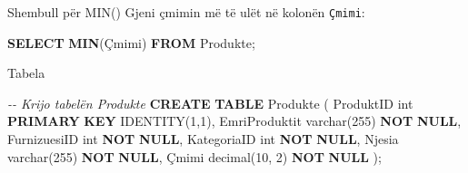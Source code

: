 \documentclass[
  ignorenonframetext,
]{beamer}
\newenvironment{Shaded}{\begin{snugshade}}{\end{snugshade}}
\newcommand{\CommentTok}[1]{\textcolor[rgb]{0.56,0.35,0.01}{\textit{#1}}}
\newcommand{\DataTypeTok}[1]{\textcolor[rgb]{0.13,0.29,0.53}{#1}}
\newcommand{\DecValTok}[1]{\textcolor[rgb]{0.00,0.00,0.81}{#1}}
\newcommand{\FunctionTok}[1]{\textcolor[rgb]{0.13,0.29,0.53}{\textbf{#1}}}
\newcommand{\KeywordTok}[1]{\textcolor[rgb]{0.13,0.29,0.53}{\textbf{#1}}}
\newcommand{\NormalTok}[1]{#1}
\begin{document}
\begin{frame}[fragile]{Shembull për MIN()}
\label{shembull-puxebr-min}
Gjeni çmimin më të ulët në kolonën \texttt{Çmimi}:


\begin{Shaded}
\begin{Highlighting}[]
\KeywordTok{SELECT} \FunctionTok{MIN}\NormalTok{(Çmimi)}
\KeywordTok{FROM}\NormalTok{ Produkte;}
\end{Highlighting}
\end{Shaded}
\end{frame}

\begin{frame}[fragile]{Tabela}
\label{tabela-2}

\begin{Shaded}
\begin{Highlighting}[]
\CommentTok{{-}{-} Krijo tabelën Produkte}
\KeywordTok{CREATE} \KeywordTok{TABLE}\NormalTok{ Produkte (}
\NormalTok{  ProduktID }\DataTypeTok{int} \KeywordTok{PRIMARY} \KeywordTok{KEY}\NormalTok{ IDENTITY(}\DecValTok{1}\NormalTok{,}\DecValTok{1}\NormalTok{),}
\NormalTok{  EmriProduktit }\DataTypeTok{varchar}\NormalTok{(}\DecValTok{255}\NormalTok{) }\KeywordTok{NOT} \KeywordTok{NULL}\NormalTok{,}
\NormalTok{  FurnizuesiID }\DataTypeTok{int} \KeywordTok{NOT} \KeywordTok{NULL}\NormalTok{,}
\NormalTok{  KategoriaID }\DataTypeTok{int} \KeywordTok{NOT} \KeywordTok{NULL}\NormalTok{,}
\NormalTok{  Njesia }\DataTypeTok{varchar}\NormalTok{(}\DecValTok{255}\NormalTok{) }\KeywordTok{NOT} \KeywordTok{NULL}\NormalTok{,}
\NormalTok{  Çmimi }\DataTypeTok{decimal}\NormalTok{(}\DecValTok{10}\NormalTok{, }\DecValTok{2}\NormalTok{) }\KeywordTok{NOT} \KeywordTok{NULL}
\NormalTok{);}
\end{Highlighting}
\end{Shaded}
\end{frame}
\end{document}
